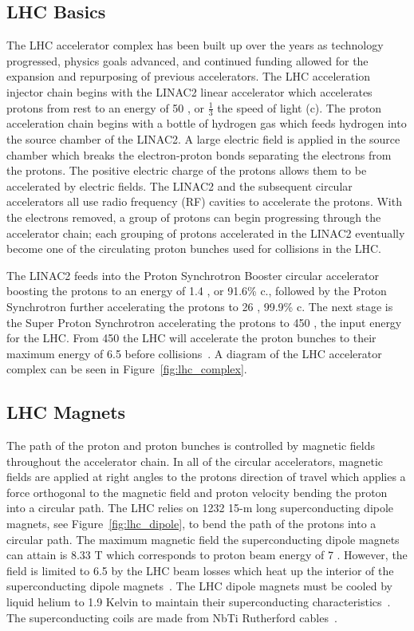 \subsection{LHC Basics}
The LHC accelerator complex has been built up over the years as technology progressed,
physics goals advanced, and continued funding allowed for the expansion and repurposing
of previous accelerators. The LHC acceleration injector chain begins with the LINAC2 linear
accelerator which accelerates protons from rest to an energy of 50 \MeV, 
or $\frac{1}{3}$ the speed of light (c).
The proton acceleration chain begins with a bottle of hydrogen gas which feeds hydrogen
into the source chamber of the LINAC2. A large electric field is applied in the source
chamber which breaks the electron-proton bonds separating the electrons from the protons.
The positive electric charge of the protons allows them to be accelerated by electric
fields. The LINAC2 and the subsequent circular accelerators all use radio frequency (RF)
cavities to accelerate the protons.
With the electrons removed, a group of protons can begin progressing through the accelerator
chain; each grouping of protons accelerated in the LINAC2 eventually become one of the 
circulating proton bunches used for collisions in the LHC.

The LINAC2 feeds into the Proton Synchrotron Booster circular accelerator boosting
the protons to an energy of 1.4 \GeV, or 91.6\% c., followed by the Proton Synchrotron further
accelerating the protons to 26 \GeV, 99.9\% c. The next stage is the Super Proton Synchrotron
accelerating the protons to 450 \GeV, the input energy for the LHC. From 450 \GeV the LHC 
will accelerate the proton bunches to their maximum energy of 6.5 \TeV before 
collisions~\cite{Voss:2009zz}.
A diagram of the LHC accelerator complex can be seen in Figure~\ref{fig:lhc_complex}.



\subsection{LHC Magnets}
The path of the proton and proton bunches is controlled by magnetic fields throughout
the accelerator chain. In all of the circular accelerators, magnetic fields are applied
at right angles to the protons direction of travel which applies a force orthogonal to
the magnetic field and proton velocity bending the proton into a circular path. The LHC
relies on 1232 15-m long superconducting dipole magnets, see Figure~\ref{fig:lhc_dipole},
to bend the path of the protons into a circular path.
The maximum magnetic field the superconducting dipole magnets can attain is 8.33 T which
corresponds to proton beam energy of 7 \TeV. However, the field is limited to 6.5 \TeV by the LHC
beam losses which heat up the interior of the superconducting dipole magnets~\cite{Voss:2009zz}.
The LHC dipole magnets must be cooled by liquid helium to 1.9 Kelvin to maintain their superconducting
characteristics~\cite{lhc_magnets}. The superconducting coils are made from NbTi Rutherford
cables~\cite{1018583}.

